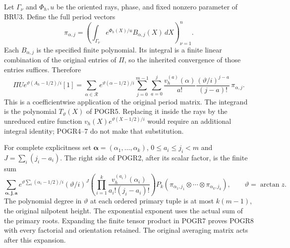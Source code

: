 Let $\Gamma_\nu$ and $\Phi_h,u$ be the oriented rays, phase,
and fixed nonzero parameter of BRU3. Define the full period vectors
\[
 \pi_{\alpha,j}=
 \left(\int_{\Gamma_\nu}e^{\Phi_h(X)/u}
                   B_{\alpha,j}(X)\,dX\right)_{\nu=1}^{n}.
 \tag{POGR6}
\]
Each $B_{\alpha,j}$ is the specified finite polynomial. Its integral
is a finite linear combination of the original entries of $\Pi$,
so the inherited convergence of those entries suffices. Therefore
\[
 \Pi U e^{\vartheta(A_h-1/2)/i}[1]
  =\sum_{\alpha\in\mathcal R}e^{\vartheta(\alpha-1/2)/i}
    \sum_{j=0}^{m-1}\sum_{a=0}^{j}
     \frac{v_h^{(a)}(\alpha)}{a!}
     \frac{(\vartheta/i)^{j-a}}{(j-a)!}\,\pi_{\alpha,j}.
 \tag{POGR7}
\]
This is a coefficientwise application of the original period matrix.
The integrand is the polynomial $T_\vartheta(X)$ of POGR5. Replacing it
inside the rays by the unreduced entire function
$v_h(X)e^{\vartheta(X-1/2)/i}$ would require an additional integral identity;
POGR4--7 do not make that substitution.

For complete explicitness set
$\boldsymbol\alpha=(\alpha_1,\ldots,\alpha_k)$,
$0\leq a_i\leq j_i<m$ and $J=\sum_i(j_i-a_i)$. The right side
of POGR2, after its scalar factor, is the finite sum
\[
 \sum_{\boldsymbol\alpha,\boldsymbol j,\boldsymbol a}
 e^{\vartheta\sum_i(\alpha_i-1/2)/i}
 (\vartheta/i)^J
 \left(\prod_{i=1}^k
       \frac{v_h^{(a_i)}(\alpha_i)}{a_i!(j_i-a_i)!}\right)
 P_k(\pi_{\alpha_1,j_1}\otimes\cdots\otimes\pi_{\alpha_k,j_k}),
 \qquad \vartheta=\arctan z.
 \tag{POGR8}
\]
The polynomial degree in $\vartheta$ at each ordered primary tuple is at most
$k(m-1)$, the original nilpotent height. The exponential exponent
uses the actual sum of the primary roots. Expanding the finite tensor
product in POGR7 proves POGR8 with every factorial and orientation
retained. The original averaging matrix acts after this expansion.

